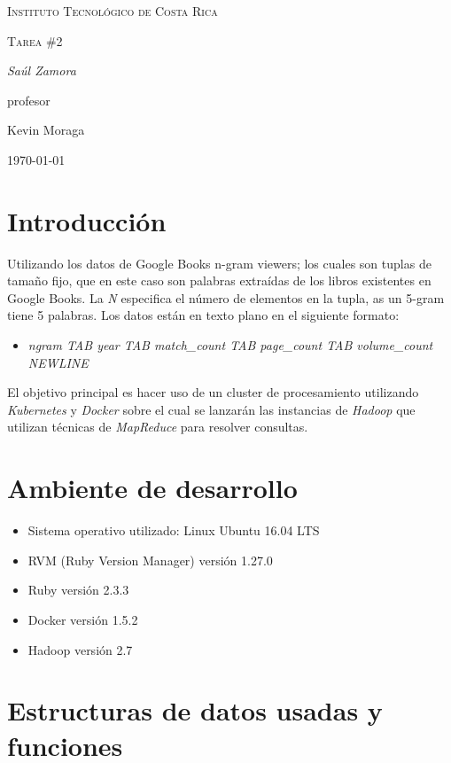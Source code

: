 \documentclass{article}
\begin{document}
\begin{titlepage}
  \centering
  {\scshape\LARGE Instituto Tecnol\'ogico de Costa Rica \par}
  \vspace{1cm}
  {\scshape\Large Tarea \#2\par}
  \vspace{1.5cm}
  {\Large\itshape Sa\'ul Zamora\par}
  \vfill
  profesor\par
  Kevin Moraga \textsc{}

  \vfill

  {\large \today\par}
\end{titlepage}

\section{Introducci\'on}
Utilizando los datos de Google Books n-gram viewers; los cuales son tuplas de tama\~no fijo, que en este caso son palabras extra\'idas de los libros existentes en Google Books. La \emph{N} especifica el n\'umero de elementos en la tupla, as un 5-gram tiene 5 palabras. Los datos est\'an en texto plano en el siguiente formato:
\begin{itemize}
  \item \emph{ngram TAB year TAB match\_count TAB page\_count TAB volume\_count NEWLINE}
\end{itemize}
El objetivo principal es hacer uso de un cluster de procesamiento utilizando \emph{Kubernetes} y \emph{Docker} sobre el cual se lanzar\'an las instancias de \emph{Hadoop} que utilizan t\'ecnicas de \emph{MapReduce} para resolver consultas.

\section{Ambiente de desarrollo}
\begin{itemize}
  \item Sistema operativo utilizado: Linux Ubuntu 16.04 LTS
  \item RVM (Ruby Version Manager) versi\'on 1.27.0
  \item Ruby versi\'on 2.3.3
  \item Docker versi\'on 1.5.2
  \item Hadoop versi\'on 2.7
\end{itemize}

\section{Estructuras de datos usadas y funciones}
\end{document}
